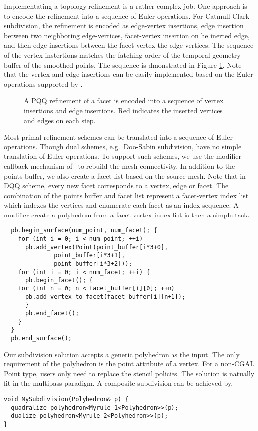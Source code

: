 Implementating a topology refinement is a rather complex job.
One approach is to encode the refinement into a sequence of
Euler operations. For Catmull-Clark subdivision, the refinement
is encoded as edge-vertex insertions, edge insertion between 
two neighboring edge-vertices, facet-vertex insertion on 
he inerted edge, and then edge insertions between the facet-vertex 
the edge-vertices. The sequence of the vertex instertions
matches the fatching order of the temporal geometry buffer of the
smoothed points. The sequence is dmonstrated in 
Figure \ref{fig:CCRefinement}. Note that the vertex and edge insertions
can be easily implemented based on the Euler operations 
supported by \cgalpoly.

\begin{figure}
  \centering
  \caption{A PQQ refinement of a facet is encoded into a sequence of
  vertex insertions and edge insertions. Red indicates the inserted
  vertices and edges on each step.}
  \label{fig:CCRefinement}
\end{figure}

Most primal refinement schemes can be translated into a sequence
of Euler operations. Though dual schemes, e.g.\ Doo-Sabin 
subdivision, have no simple translation of Euler operations.  
To support such schemes, we use the modifier
callback mechanism of \cgalpoly\ to rebuild the mesh 
connectivity. In addition to the points buffer, we also 
create a facet list based on the source mesh. Note that
in DQQ scheme, every new facet corresponds to a vertex, edge 
or facet. The combination of the points buffer and facet list
represent a facet-vertex index list which indexes the vertices and
enumerate each facet as an index sequence. A modifier create
a polyhedron from a facet-vertex index list is then a simple task.
\begin{lstlisting}
  pb.begin_surface(num_point, num_facet); {
    for (int i = 0; i < num_point; ++i) 
      pb.add_vertex(Point(point_buffer[i*3+0], 
			  point_buffer[i*3+1], 
			  point_buffer[i*3+2]));	
    for (int i = 0; i < num_facet; ++i) {
      pb.begin_facet(); {
	for (int n = 0; n < facet_buffer[i][0]; ++n)
	  pb.add_vertex_to_facet(facet_buffer[i][n+1]);
      }
      pb.end_facet();
    }
  }
  pb.end_surface();
\end{lstlisting}

Our subdivision solution accepts a generic polyhedron as the input.
The only requirement of the polyhedron is the 
point attribute of a vertex. For a non-CGAL Point
type, users only need to replace the stencil policies.
The solution is natually fit in the multipass paradigm.
A composite subdivision can be achieved by,
\begin{lstlisting}
void MySubdivision(Polyhedron& p) {
  quadralize_polyhedron<Myrule_1<Polyhedron>>(p);
  dualize_polyhedron<Myrule_2<Polyhedron>>(p);
} 
\end{lstlisting}


